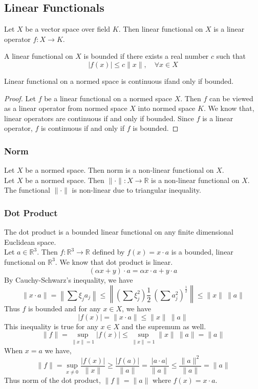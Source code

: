 \subsection{Linear Functionals}
\begin{definition}
	Let $X$ be a vector space over field $K$.
	Then linear functional on $X$ is a linear operator $f : X \to K$.
\end{definition}
\begin{definition}
	A linear functional on $X$ is bounded if there exists a real number $c$ such that
	\[ |f(x)| \le c\|x\|,\quad \forall x \in X \]
\end{definition}

\begin{theorem}
	Linear functional on a normed space is continuous ifand only if bounded.
\end{theorem}
\begin{proof}
	Let $f$ be a linear functional on a normed space $X$.
	Then $f$ can be viewed as a linear operator from normed space $X$ into normed space $K$.
	We know that, linear operators are continuous if and only if bounded.
	Since $f$ is a linear operator, $f$ is continuous if and only if $f$ is bounded.
\end{proof}

\subsubsection{Norm} Let $X$ be a normed space. Then norm is a non-linear functional on $X$.\\

		Let $X$ be a normed space.
		Then $\|\cdot\| : X \to \mathbb{R}$ is a non-linear functional on $X$.
		The functional $\|\cdot\|$ is non-linear due to triangular inequality.

\subsubsection{Dot Product}
The dot product is a bounded linear functional on any finite dimensional Euclidean space.\\

		Let $a \in \mathbb{R}^3$.
		Then $f : \mathbb{R}^3 \to \mathbb{R}$ defined by $f(x) = x \cdot a$ is a bounded, linear functional on $\mathbb{R}^3$.
		We know that dot product is linear.
		\[ (\alpha x+y) \cdot a = \alpha x \cdot a + y \cdot a \]
		By Cauchy-Schwarz's inequality, we have 
		\[ \|x \cdot a\| = \left\| \sum \xi_j a_j \right\| \le \left\| \left( \sum \xi_j^2 \right)\frac{1}{2} \ \left(\sum a_j^2 \right)^\frac{1}{2} \right\| \le \|x\| \ \|a\| \]
		Thus $f$ is bounded and for any $x \in X$, we have
		\[ |f(x)| = \|x \cdot a\| \le \|x\| \ \|a\| \]
		This inequality is true for any $x \in X$ and the supremum as well.
		\[ \|f\| = \sup_{\|x\| = 1} |f(x)| \le \sup_{\|x\| = 1 } \|x\| \ \|a\| = \|a\| \]
		When $x = a$ we have,
		\[ \|f\| = \sup_{x \ne 0} \frac{|f(x)|}{\|x\|} \ge \frac{|f(a)|}{\|a\|} = \frac{|a \cdot a|}{\|a\|} \le \frac{\|a\|^2}{\|a\|} = \| a \| \]
		Thus norm of the dot product, $\|f\| = \|a\|$ where $f(x) = x \cdot a$.
